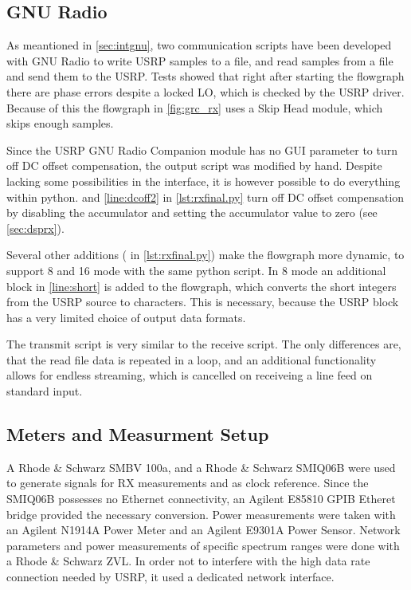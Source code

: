 \documentclass[12pt,a4paper,parskip=full,abstracton]{scrartcl}
\begin{document}
\subsection{GNU Radio}
\label{sec:measgnu}
As meantioned in \cref{sec:intgnu}, two communication scripts have been developed with GNU
Radio to write USRP samples to a file, and read samples from a file and send them to the USRP.
Tests showed that right after starting the flowgraph there are phase errors despite a
locked LO, which is checked by the USRP driver. Because of this the flowgraph in \cref{fig:grc_rx}
uses a {\ttfamily Skip Head} module, which skips enough samples.

Since the USRP GNU Radio Companion module has no GUI parameter to turn off DC offset
compensation, the output script was modified by hand. Despite lacking some possibilities
in the interface, it is however possible to do everything within python.
 and \cref{line:dcoff2} in \cref{lst:rxfinal.py} turn off DC offset
compensation by disabling the accumulator and setting the accumulator value to zero 
(see \cref{sec:dsprx}).

Several other additions ( in \cref{lst:rxfinal.py})
make the flowgraph more dynamic, to support \SI{8}{\bit} and \SI{16}{\bit} mode with
the same python script. In \SI{8}{\bit} mode an additional block in \cref{line:short}
is added to the flowgraph, which converts the short integers from the USRP source to
characters. This is necessary, because the USRP block has a very limited choice of
output data formats.

The transmit script is very similar to the receive script. The only differences are,
that the read file data is repeated in a loop, and an additional functionality
allows for endless streaming, which is cancelled on receiveing a line feed on
standard input.
\subsection{Meters and Measurment Setup}
A Rhode \& Schwarz SMBV 100a, and a Rhode \& Schwarz SMIQ06B were used to generate
signals for RX measurements and as clock reference. Since the SMIQ06B possesses no
Ethernet connectivity, an Agilent E85810 GPIB Etheret bridge provided the necessary
conversion. Power measurements were taken with an Agilent N1914A Power Meter and an
Agilent E9301A Power Sensor. Network parameters and power measurements of specific
spectrum ranges were done with a Rhode \& Schwarz ZVL. In order not to interfere
with the high data rate connection needed by USRP, it used a dedicated network interface.
\end{document}
